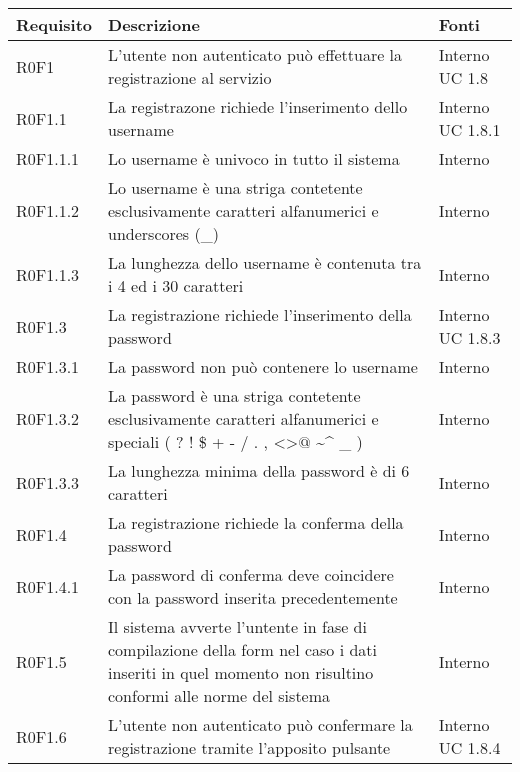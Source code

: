 \begin{center}

	\def\arraystretch{1.5}
	\bgroup
	\begin{longtable}{| p{2cm} | p{7cm} | p{2cm} |}

		\hline
		\textbf{Requisito} & \textbf{Descrizione} & \textbf{Fonti} \\
		\hline

		R0F1  &  L'utente non autenticato può effettuare la registrazione al servizio  &  Interno \newline UC 1.8 \\
		\hline
		R0F1.1  &  La registrazone richiede l'inserimento dello username  &  Interno \newline UC 1.8.1 \\
		\hline
		R0F1.1.1  &  Lo username è univoco in tutto il sistema  &  Interno \newline \\
		\hline
		R0F1.1.2  &  Lo username è una striga contetente esclusivamente caratteri alfanumerici e underscores (\_)  &  Interno \\
		\hline
		R0F1.1.3  &  La lunghezza dello username è contenuta tra i 4 ed i 30 caratteri &  Interno \\
		\hline
		R0F1.3  &  La registrazione richiede l'inserimento della password  &  Interno \newline UC 1.8.3 \\
		\hline
		R0F1.3.1  &  La password non può contenere lo username  &  Interno \\
		\hline
		R0F1.3.2  &  La password è una striga contetente esclusivamente caratteri alfanumerici e speciali ( ? ! \$ + - / . , \textless \textgreater $@$ \textasciitilde \^{} \_ )  & Interno \\
		\hline
		R0F1.3.3  &  La lunghezza minima della password è di 6 caratteri  &  Interno \\
		\hline
		R0F1.4  &  La registrazione richiede la conferma della password & Interno \\
		\hline
		R0F1.4.1  &  La password di conferma deve coincidere con la password inserita precedentemente  &  Interno \\
		\hline
		R0F1.5  &  Il sistema avverte l'untente in fase di compilazione della form nel caso i dati inseriti in quel momento non risultino conformi alle norme del sistema  &  Interno \\
		\hline
		R0F1.6  &  L'utente non autenticato può confermare la registrazione tramite l'apposito pulsante & Interno \newline UC 1.8.4 \\

\end{longtable}
\end{center}
